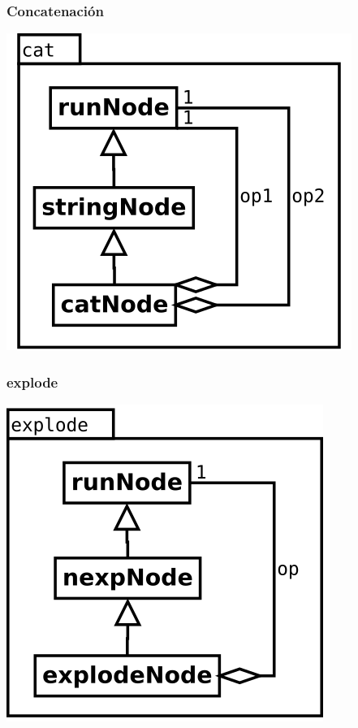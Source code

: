 \subsubsection {Concatenación}
\begin{center}
\includegraphics[scale=0.4]{cat.png} \\
\end{center}

\subsubsection {explode}
\begin{center}
\includegraphics[scale=0.4]{explode.png} \\
\end{center}

